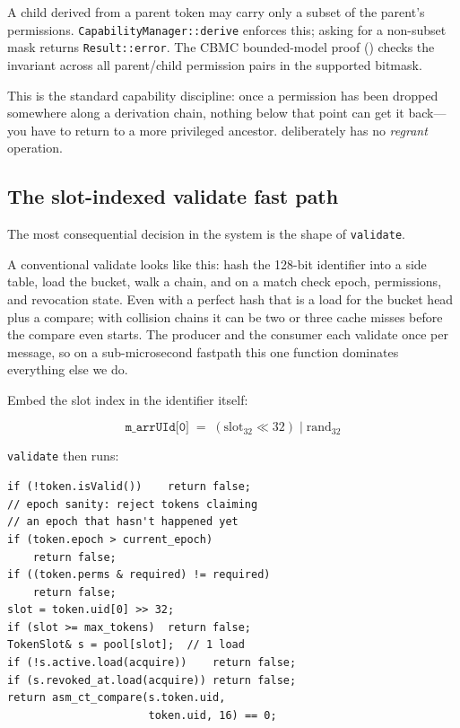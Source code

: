 A child derived from a parent token may carry only a subset of the
parent's permissions. \texttt{CapabilityManager::derive} enforces
this; asking for a non-subset mask returns \texttt{Result::error}.
The CBMC bounded-model proof () checks the
invariant across all parent/child permission pairs in the supported
bitmask.

This is the standard capability discipline: once a permission has
been dropped somewhere along a derivation chain, nothing below that
point can get it back---you have to return to a more privileged
ancestor. \sysname deliberately has no \textit{regrant} operation.

\subsection{The slot-indexed validate fast path}
\label{sec:design:fastpath}

The most consequential decision in the system is the shape of
\texttt{validate}.

A conventional validate looks like this: hash the 128-bit identifier
into a side table, load the bucket, walk a chain, and on a match
check epoch, permissions, and revocation state. Even with a perfect
hash that is a load for the bucket head plus a compare; with
collision chains it can be two or three cache misses before the
compare even starts. The producer and the consumer each validate once
per message, so on a sub-microsecond fastpath this one function
dominates everything else we do.

Embed the slot index in the identifier itself:

\begin{equation*}
\texttt{m\_arrUId[0]} \;=\; (\text{slot}_{32} \ll 32) \;|\;
                            \text{rand}_{32}
\end{equation*}

\noindent
\texttt{validate} then runs:

\begin{verbatim}
if (!token.isValid())    return false;
// epoch sanity: reject tokens claiming
// an epoch that hasn't happened yet
if (token.epoch > current_epoch)
    return false;
if ((token.perms & required) != required)
    return false;
slot = token.uid[0] >> 32;
if (slot >= max_tokens)  return false;
TokenSlot& s = pool[slot];  // 1 load
if (!s.active.load(acquire))    return false;
if (s.revoked_at.load(acquire)) return false;
return asm_ct_compare(s.token.uid,
                      token.uid, 16) == 0;
\end{verbatim}

